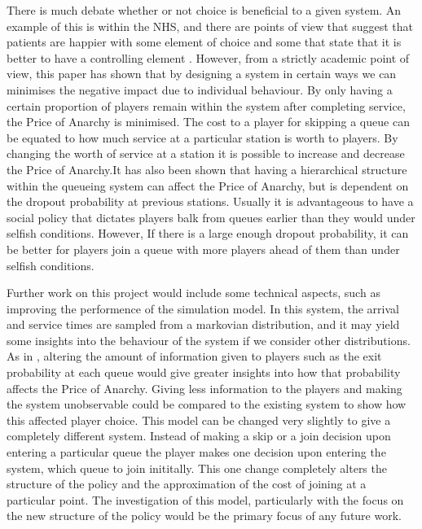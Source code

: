 \documentclass[12pt]{article}
\begin{document}
There is much debate whether or not choice is beneficial to a given system. An example of this is within the NHS, and there are points of view that suggest that patients are happier with some element of choice \cite{cite017} and some that state that it is better to have a controlling element \cite{cite016}. However, from a strictly academic point of view, this paper has shown that by designing a system in certain ways we can minimises the negative impact due to individual behaviour. By only having a certain proportion of players remain within the system after completing service, the Price of Anarchy is minimised. The cost to a player for skipping a queue can be equated to how much service at a particular station is worth to players. By changing the worth of service at a station it is possible to increase and decrease the Price of Anarchy.It has also been shown that having a hierarchical structure within the queueing system can affect the Price of Anarchy, but is dependent on the dropout probability at previous stations. Usually it is advantageous to have a social policy that dictates players balk from queues earlier than they would under selfish conditions. However, If there is a large enough dropout probability, it can be better for players join a queue with more players ahead of them than under selfish conditions.

  Further work on this project would include some technical aspects, such as improving the performence of the simulation model. In this system, the arrival and service times are sampled from a markovian distribution, and it may yield some insights into the behaviour of the system if we consider other distributions. As in \cite{cite010}, altering the amount of information given to players such as the exit probability at each queue would give greater insights into how that probability affects the Price of Anarchy. Giving less information to the players and making the system unobservable could be compared to the existing system to show how this affected player choice.
    This model can be changed very slightly to give a completely different system. Instead of making a skip or a join decision upon entering a particular queue the player makes one decision upon entering the system, which queue to join inititally. This one change completely alters the structure of the policy and  the approximation of the cost of joining at a particular point. The investigation of this model, particularly with the focus on the new structure of the policy would be the primary focus of any future work.

\pagebreak

\footnotesize{}
\end{document}
